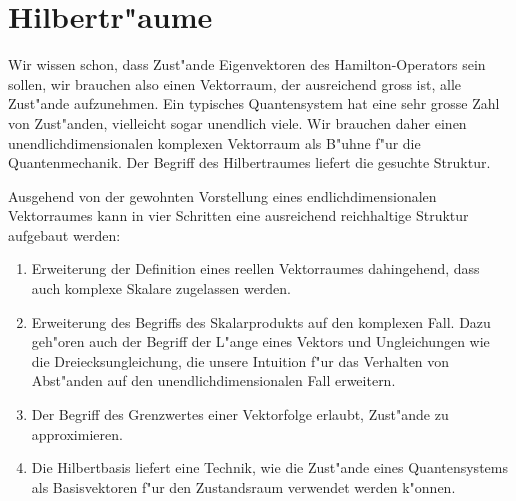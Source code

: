 \chapter{Hilbertr"aume}
\rhead{}
Wir wissen schon, dass Zust"ande Eigenvektoren des Hamilton-Operators
sein sollen, wir brauchen
also einen Vektorraum, der ausreichend gross ist, alle Zust"ande aufzunehmen.
Ein typisches Quantensystem hat eine sehr grosse Zahl von Zust"anden,
vielleicht sogar unendlich viele.
Wir brauchen daher einen unendlichdimensionalen komplexen Vektorraum als
B"uhne f"ur die Quantenmechanik.
Der Begriff des Hilbertraumes liefert die gesuchte Struktur.

Ausgehend von der gewohnten Vorstellung eines endlichdimensionalen
Vektorraumes kann in vier Schritten eine ausreichend reichhaltige
Struktur aufgebaut werden:
\begin{enumerate}
\item Erweiterung der Definition eines reellen Vektorraumes dahingehend,
dass auch komplexe Skalare zugelassen werden.
\item Erweiterung des Begriffs des Skalarprodukts auf den komplexen Fall.
Dazu geh"oren auch der Begriff der L"ange eines Vektors und Ungleichungen
wie die Dreiecksungleichung, die unsere Intuition f"ur das Verhalten von
Abst"anden auf den unendlichdimensionalen Fall erweitern.
\item Der Begriff des Grenzwertes einer Vektorfolge erlaubt, Zust"ande
zu approximieren.
\item Die Hilbertbasis liefert eine Technik, wie die Zust"ande eines
Quantensystems als Basisvektoren f"ur den Zustandsraum verwendet werden
k"onnen.
\end{enumerate}

